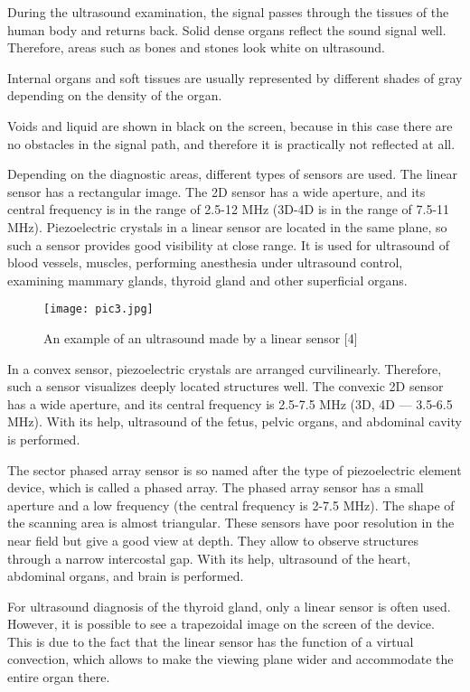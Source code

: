 \documentclass[10pt, twocolumn, a4paper]{article}
\begin{document}
During the ultrasound examination, the signal passes through the tissues of the human body and returns back. Solid dense organs reflect the sound signal well. Therefore, areas such as bones and stones look white on ultrasound.

Internal organs and soft tissues are usually represented by different shades of gray depending on the density of the organ.

Voids and liquid are shown in black on the screen, because in this case there are no obstacles in the signal path, and therefore it is practically not reflected at all.

Depending on the diagnostic areas, different types of sensors are used. The linear sensor has a rectangular image. The 2D sensor has a wide aperture, and its central frequency is in the range of 2.5-12 MHz (3D-4D is in the range of 7.5-11 MHz). Piezoelectric crystals in a linear sensor are located in the same plane, so such a sensor provides good visibility at close range. It is used for ultrasound of blood vessels, muscles, performing anesthesia under ultrasound control, examining mammary glands, thyroid gland and other superficial organs.

\begin{figure}[h!]
    \centering
    \texttt{[image: pic3.jpg]}
    \caption{An example of an ultrasound made by a linear sensor [4]}
    \label{fig:figure3}
\end{figure}

In a convex sensor, piezoelectric crystals are arranged curvilinearly. Therefore, such a sensor visualizes deeply located structures well. The convexic 2D sensor has a wide aperture, and its central frequency is 2.5-7.5 MHz (3D, 4D — 3.5-6.5 MHz). With its help, ultrasound of the fetus, pelvic organs, and abdominal cavity is performed.

The sector phased array sensor is so named after the type of piezoelectric element device, which is called a phased array. The phased array sensor has a small aperture and a low frequency (the central frequency is 2-7.5 MHz). The shape of the scanning area is almost triangular. These sensors have poor resolution in the near field but give a good view at depth. They allow to observe structures through a narrow intercostal gap. With its help, ultrasound of the heart, abdominal organs, and brain is performed.

For ultrasound diagnosis of the thyroid gland, only a linear sensor is often used. However, it is possible to see a trapezoidal image on the screen of the device. This is due to the fact that the linear sensor has the function of a virtual convection, which allows to make the viewing plane wider and accommodate the entire organ there.
\end{document}
